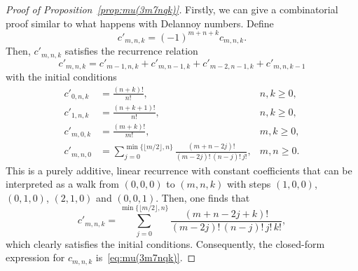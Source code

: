 \documentclass[11pt, a4paper]{article}
\theoremstyle{plain}
\theoremstyle{definition}
\begin{document}
\begin{proof}[Proof of Proposition~\ref{prop:mu(3m7nqk)}]
Firstly, we can give a combinatorial proof similar to what happens with Delannoy numbers.
Define
\begin{equation*}
  c'_{m,n,k} = (-1)^{m+n+k} c_{m,n,k}.
\end{equation*}
Then, $c'_{m,n,k}$ satisfies the recurrence relation
\begin{equation}
\label{eq:recc'}
  c'_{m,n,k} = c'_{m-1,n,k} + c'_{m,n-1,k} + c'_{m-2,n-1,k} + c'_{m,n,k-1}
\end{equation}
with the initial conditions
\begin{align*}
  c'_{0,n,k} &= \frac{(n+k)!}{n!}, & n,k\ge0,\\
  c'_{1,n,k} &= \frac{(n+k+1)!}{n!}, & n,k\ge0,\\
  c'_{m,0,k} &= \frac{(m+k)!}{m!}, & m,k\ge0,\\
  c'_{m,n,0} &= \sum_{j=0}^{\min\{\lfloor m/2\rfloor, n\}}
  \frac{(m+n - 2j)!}{(m - 2j)!\,(n - j)!\,j!}, & m,n\ge0.
\end{align*}
This is a purely additive, linear recurrence with constant coefficients
that can be interpreted as a walk from $(0,0,0)$ to $(m,n,k)$
with steps $(1,0,0)$, $(0,1,0)$, $(2,1,0)$ and $(0,0,1)$.
Then, one finds that 
\begin{equation}
\label{eq:c'}
  c'_{m,n,k} = \sum_{j=0}^{\min\{\lfloor m/2\rfloor,n\}}
  \frac{(m+n - 2j + k)!}{(m - 2j)!\,(n - j)!\,j!\,k!},
\end{equation}
which clearly satisfies the initial conditions.
Consequently, the closed-form expression for $c_{m,n,k}$ is~\eqref{eq:mu(3m7nqk)}.


\end{proof}
\end{document}
